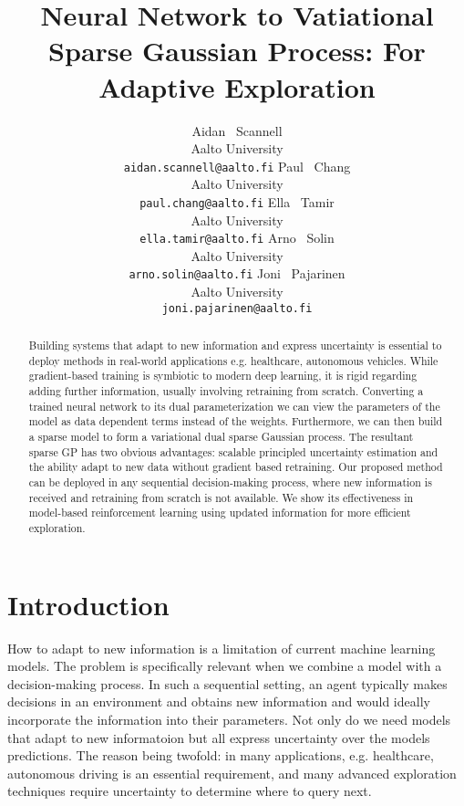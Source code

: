 \documentclass{article}
\title{Neural Network to Vatiational Sparse Gaussian Process: For Adaptive Exploration}
\author{%
  Aidan ~Scannell \\
  Aalto University\\
  \texttt{aidan.scannell@aalto.fi}
  \And
  Paul ~Chang \\
  Aalto University\\
  \texttt{paul.chang@aalto.fi}
  \And
  Ella ~Tamir \\
  Aalto University\\
  \texttt{ella.tamir@aalto.fi}
  \And
  Arno ~Solin \\
  Aalto University\\
  \texttt{arno.solin@aalto.fi}
  \And
  Joni ~Pajarinen \\
  Aalto University\\
  \texttt{joni.pajarinen@aalto.fi}
}
\begin{document}
\maketitle

\begin{abstract}
Building systems that adapt to new information and express uncertainty is essential to deploy methods in real-world applications e.g. healthcare, autonomous vehicles. While gradient-based training is symbiotic to modern deep learning, it is rigid regarding adding further information, usually involving retraining from scratch. Converting a trained neural network to its dual parameterization we can view the parameters of the model as data dependent terms instead of the weights. Furthermore, we can then build a sparse model to form a variational dual sparse Gaussian process. The resultant sparse GP has two obvious advantages: scalable principled uncertainty estimation and the ability adapt to new data without gradient based retraining. Our proposed method can be deployed in any sequential decision-making process, where new information is received and retraining from scratch is not available. We show its effectiveness in model-based reinforcement learning using updated information for more efficient exploration.
\end{abstract}


\section{Introduction} \label{sec:intro}
How to adapt to new information is a limitation of current machine learning models. The problem is specifically relevant when we combine a model with a decision-making process. In such a sequential setting, an agent typically makes decisions in an environment and obtains new information and would ideally incorporate the information into their parameters. Not only do we need models that adapt to new informatoion but all express uncertainty over the models predictions. The reason being twofold: in many applications, e.g. healthcare, autonomous driving is an essential requirement, and many advanced exploration techniques require uncertainty to determine where to query next.
\end{document}
